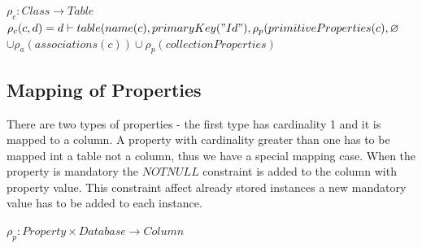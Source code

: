 \documentclass[11pt]{article}
\begin{document}
\begin{center}
$\rho_{c}: Class \rightarrow Table $ \\ 
$\rho_{c}(c,d) = d \vdash table(name(c), primaryKey("Id"), \rho_{p}(primitiveProperties(c), \varnothing $\\$ \cup \rho_{a}(associations(c)) \cup \rho_{p}(collectionProperties)$
\end{center}



\subsection{Mapping of Properties}
There are two types of properties - the first type has cardinality 1  and it is mapped to a column. A property with cardinality greater than one has to be mapped int a table not a column, thus we have a special mapping case. When the property is mandatory the $NOTNULL$ constraint is added to the column with property value. This constraint affect already stored instances a new mandatory value has to be added to each instance.

$
\rho_p : Property \times Database \rightarrow Column 
$
\end{document}
